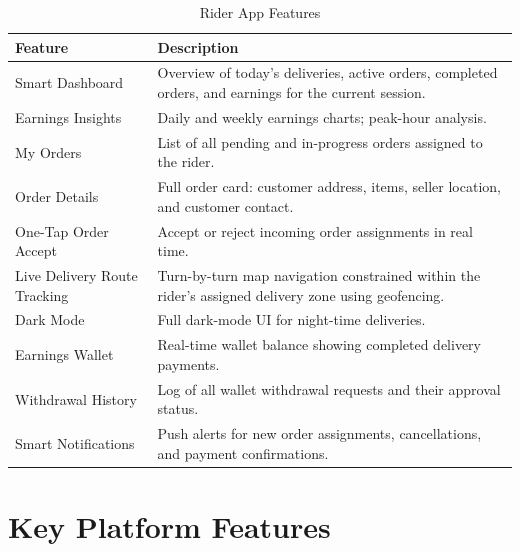 \documentclass[12pt, a4paper, oneside]{report}
\begin{document}
\begin{table}[H]
\centering
\caption{Rider App Features}
\label{tab:rider-app}
\begin{tabularx}{\textwidth}{@{} L{3.6cm} X @{}}
\toprule
\textbf{Feature} & \textbf{Description} \\
\midrule
Smart Dashboard
  & Overview of today's deliveries, active orders, completed orders, and
    earnings for the current session. \\[4pt]
Earnings Insights
  & Daily and weekly earnings charts; peak-hour analysis. \\[4pt]
My Orders
  & List of all pending and in-progress orders assigned to the rider. \\[4pt]
Order Details
  & Full order card: customer address, items, seller location, and customer
    contact. \\[4pt]
One-Tap Order Accept
  & Accept or reject incoming order assignments in real time. \\[4pt]
Live Delivery Route Tracking
  & Turn-by-turn map navigation constrained within the rider's assigned
    delivery zone using geofencing. \\[4pt]
Dark Mode
  & Full dark-mode UI for night-time deliveries. \\[4pt]
Earnings Wallet
  & Real-time wallet balance showing completed delivery payments. \\[4pt]
Withdrawal History
  & Log of all wallet withdrawal requests and their approval status. \\[4pt]
Smart Notifications
  & Push alerts for new order assignments, cancellations, and payment
    confirmations. \\
\bottomrule
\end{tabularx}
\end{table}

\section{Key Platform Features}
\end{document}
